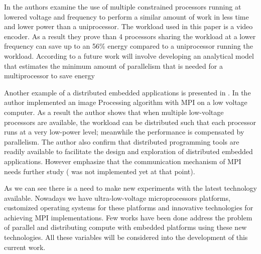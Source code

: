In \cite{Weglarz} the authors examine the use of multiple constrained
processors running at lowered voltage and frequency to perform a similar amount
of work in less time and lower power than a uniprocessor.  The workload used in
this paper is a video encoder. As a result they prove than 4 processors sharing
the workload at a lower frequency can save up to an 56\% energy compared to a
uniprocessor running the workload. According to \cite{Weglarz} a future work
will involve developing an analytical model that estimates the minimum amount
of parallelism that is needed for a multiprocessor to save energy

Another example of a distributed embedded applications is presented in
\cite{Liu}. In \cite{Liu} the author implemented an image Processing algorithm
with MPI on a low voltage computer. As a result the author shows that when
multiple low-voltage processors are available, the workload can be distributed
such that each processor runs at a very low-power level; meanwhile the
performance is compensated by parallelism. The author also confirm that
distributed programming tools are readily available to facilitate the design
and exploration of distributed embedded applications. However emphasize that
the communication mechanism of MPI needs further study ( \cite{Abgaria} was not
implemented yet at that point). 

As we can see there is a need to make new experiments with the latest
technology available. Nowadays we have ultra-low-voltage microprocessors
platforms, customized operating systems for these platforms and  innovative
technologies for achieving MPI implementations. Few works \cite{Victor-Marcos}
have been done address the problem of parallel and distributing compute with
embedded platforms using these new technologies. All these variables will be
considered into the development of this current work.

\newpage

\clearpage

